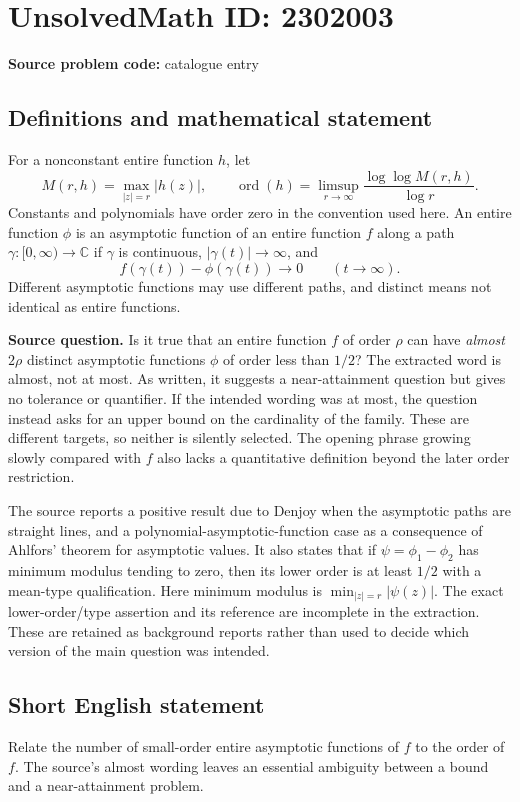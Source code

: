 \documentclass[11pt]{article}
\begin{document}
\section*{UnsolvedMath ID: 2302003}
\textbf{Source problem code:} catalogue entry
\subsection{Definitions and mathematical statement}
For a nonconstant entire function $h$, let
\[
M(r,h)=\max_{|z|=r}|h(z)|,\qquad
\operatorname{ord}(h)=\limsup_{r\to\infty}\frac{\log\log M(r,h)}{\log r}.
\]
Constants and polynomials have order zero in the convention used here. An entire function $\phi$ is an asymptotic function of an entire function $f$ along a path $\gamma:[0,\infty)\to\mathbb C$ if $\gamma$ is continuous, $|\gamma(t)|\to\infty$, and
\[
f(\gamma(t))-\phi(\gamma(t))\longrightarrow0\qquad(t\to\infty).
\]
Different asymptotic functions may use different paths, and distinct means not identical as entire functions.

\textbf{Source question.} Is it true that an entire function $f$ of order $\rho$ can have \emph{almost $2\rho$} distinct asymptotic functions $\phi$ of order less than $1/2$? The extracted word is almost, not at most. As written, it suggests a near-attainment question but gives no tolerance or quantifier. If the intended wording was at most, the question instead asks for an upper bound on the cardinality of the family. These are different targets, so neither is silently selected. The opening phrase growing slowly compared with $f$ also lacks a quantitative definition beyond the later order restriction.

The source reports a positive result due to Denjoy when the asymptotic paths are straight lines, and a polynomial-asymptotic-function case as a consequence of Ahlfors' theorem for asymptotic values. It also states that if $\psi=\phi_1-\phi_2$ has minimum modulus tending to zero, then its lower order is at least $1/2$ with a mean-type qualification. Here minimum modulus is $\min_{|z|=r}|\psi(z)|$. The exact lower-order/type assertion and its reference are incomplete in the extraction. These are retained as background reports rather than used to decide which version of the main question was intended.
\subsection{Short English statement}
Relate the number of small-order entire asymptotic functions of $f$ to the order of $f$. The source’s almost wording leaves an essential ambiguity between a bound and a near-attainment problem.
\end{document}
